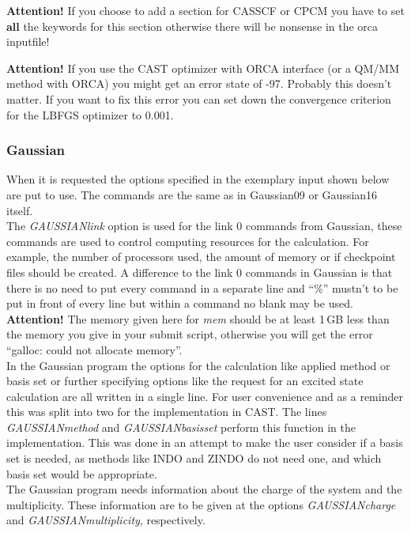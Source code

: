 \documentclass[10pt,a4paper]{article} %
\begin{document}
\textbf{Attention!} If you choose to add a section for CASSCF or CPCM you have to set \textbf{all} the keywords for this section otherwise there will be nonsense in the orca inputfile!

\textbf{Attention!} If you use the CAST optimizer with ORCA interface (or a QM/MM method with ORCA) you might get an error state of -97. Probably this doesn't matter. If you want to fix this error you can set down the convergence criterion for the LBFGS optimizer to 0.001.
			
			\subsubsection{Gaussian}
 When it is requested the options specified in the exemplary input shown below are put to use. The commands are the same as in Gaussian09\supercite{M.J.Frisch2009} or Gaussian16 itself.\\
The \textit{GAUSSIANlink} option is used for the link 0 commands from Gaussian, these commands are used to control computing resources for the calculation. For example, the number of processors used, the amount of memory or if checkpoint files should be created. A difference to the link 0 commands in Gaussian is that there is no need to put every command in a separate line and ``\%'' mustn't to be put in front of every line but within a command no blank may be used. \textbf{Attention!} The memory given here for \textit{mem} should be at least 1\,GB less than the memory you give in your submit script, otherwise you will get the error ``galloc: could not allocate memory''.\\
In the Gaussian program the options for the calculation like applied method or basis set or further specifying options like the request for an excited state calculation are all written in a single line. For user convenience and as a reminder this was split into two for the implementation in CAST. The lines \textit{GAUSSIANmethod} and \textit{GAUSSIANbasisset} perform this function in the implementation. This was done in an attempt to make the user consider if a basis set is needed, as methods like INDO\supercite{Pople1967} and ZINDO\supercite{Ridley1973,Ridley1976} do not need one, and which basis set would be appropriate.\\
The Gaussian program needs information about the charge of the system and the multiplicity. These information are to be given at the options \textit{GAUSSIANcharge} and \textit{GAUSSIANmultiplicity}, respectively.\\
\end{document}
